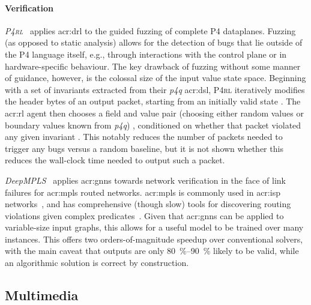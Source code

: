 \paragraph{Verification}
\emph{\textsc{P4rl}}~\parencite{DBLP:conf/sigcomm/ShuklaHH019} applies \gls{acr:drl} to the guided fuzzing of complete P4 dataplanes.
Fuzzing (as opposed to static analysis) allows for the detection of bugs that lie outside of the P4 language itself, e.g., through interactions with the control plane or in hardware-specific behaviour.
The key drawback of fuzzing without some manner of guidance, however, is the colossal size of the input value state space.
Beginning with a set of invariants extracted from their \emph{p4q} \gls{acr:dsl}, \textsc{P4rl} iteratively modifies the header bytes of an output packet, starting from an initially valid state \prllitstate{}.
The \gls{acr:rl} agent then chooses a field and value pair (choosing either random values or boundary values known from \emph{p4q}) \prllitact{}, conditioned on whether that packet violated any given invariant \prllitreward{}.
This notably reduces the number of packets needed to trigger any bugs versus a random baseline, but it is not shown whether this reduces the wall-clock time needed to output such a packet.

\emph{DeepMPLS}~\parencite{DBLP:conf/networking/Geyer019} applies \glspl{acr:gnn} towards network verification in the face of link failures for \gls{acr:mpls} routed networks.
\gls{acr:mpls} is commonly used in \gls{acr:isp} networks~\parencite{DBLP:conf/imc/VanaubelMPD15}, and has comprehensive (though slow) tools for discovering routing violations given complex predicates~\parencite{DBLP:conf/conext/JensenKM0ST18}.
Given that \glspl{acr:gnn} can be applied to variable-size input graphs, this allows for a useful model to be trained over many instances.
This offers two orders-of-magnitude speedup over conventional solvers, with the main caveat that outputs are only \qtyrange{80}{90}{\percent} likely to be valid, while an algorithmic solution is correct by construction.

\subsection{Multimedia}

